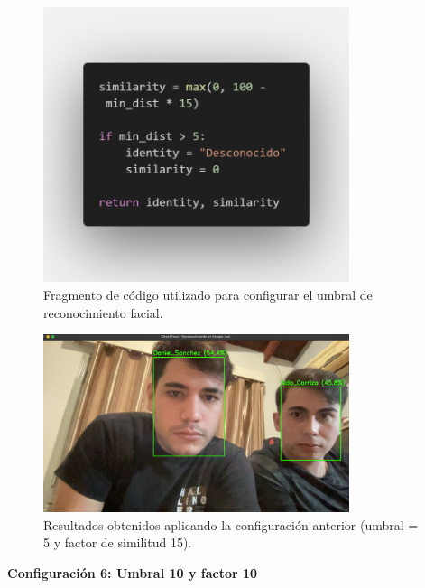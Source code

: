 \begin{figure}[H]
    \centering
    \includegraphics[width=0.8\textwidth]{capitulo_04/imagenes/5.png}
    \caption{Fragmento de código utilizado para configurar el umbral de reconocimiento facial.}
\end{figure}

\begin{figure}[H]
    \centering
    \includegraphics[width=0.8\textwidth]{capitulo_04/imagenes/5.5.jpg}
    \caption{Resultados obtenidos aplicando la configuración anterior (umbral = 5 y factor de similitud 15).}
\end{figure}


\newpage


\textbf{Configuración 6: Umbral 10 y factor 10}

